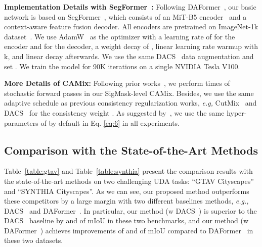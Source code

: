 \documentclass[journal]{IEEEtran}
\begin{document}
{\begin{minipage}{\textwidth}
\noindent
\textbf{Implementation Details with SegFormer~\cite{xie2021segformer}:}
Following DAFormer~\cite{hoyer2022daformer}, our basic network is based on SegFormer~\cite{xie2021segformer}, which consists of an MiT-B5 encoder~\cite{xie2021segformer} and a context-aware feature fusion decoder. All encoders are pretrained on ImageNet-1k dataset~\cite{deng2009imagenet}. 
We use AdamW~\cite{loshchilov2018decoupled} as the optimizer with a learning rate of  for the encoder and  for the decoder, a weight decay of , linear learning rate warmup with k, and linear decay afterwards. We use the same DACS~\cite{tranheden2020dacs} data augmentation and set . We train the model for 90K iterations on a single NVIDIA Tesla V100.


\noindent
\textbf{More Details of CAMix:}
Following prior works~\cite{kim2019self,zhou2020uncertainty}, we perform  times of stochastic forward passes in our SigMask-level CAMix. Besides, we use the same adaptive schedule as previous consistency regularization works, \emph{e.g,} CutMix~\cite{french2019semi} and DACS~\cite{tranheden2020dacs} for the consistency weight . As suggested by~\cite{kim2019self,zhou2020uncertainty}, we use the same hyper-parameters of   by default in Eq. \ref{eq:6} in all experiments.

\subsection{Comparison with the State-of-the-Art Methods}
\label{sec:comparison_to_sota}
Table~\ref{table:gtav} and Table~\ref{table:synthia} present the comparison results with the state-of-the-art methods on two challenging UDA tasks: ``GTAV  Cityscapes'' and ``SYNTHIA  Cityscapes''. As we can see, our proposed method outperforms these competitors by a large margin with two different baselines methods, \emph{e.g.,} DACS~\cite{tranheden2020dacs} and DAFormer~\cite{hoyer2022daformer}. In particular, our method (w DACS~\cite{tranheden2020dacs}) is superior to the DACS~\cite{tranheden2020dacs} baseline by  and  of mIoU in these two benchmarks, and our method (w DAFormer~\cite{hoyer2022daformer}) achieves improvements of  and  of mIoU compared to DAFormer~\cite{hoyer2022daformer} in these two datasets.




\end{minipage}}
\end{document}
